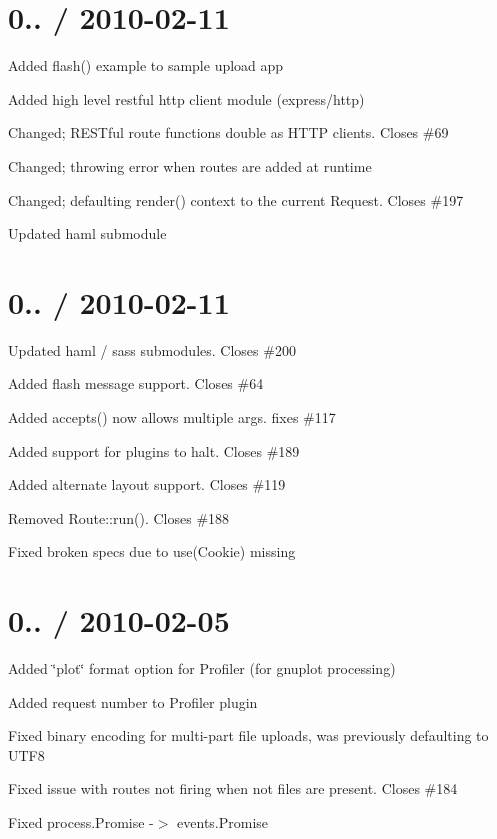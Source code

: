 \section*{0.. / 2010-\/02-\/11 }


\begin{DoxyItemize}
\item Added flash() example to sample upload app
\item Added high level restful http client module (express/http)
\item Changed; R\+E\+S\+Tful route functions double as H\+T\+T\+P clients. Closes \#69
\item Changed; throwing error when routes are added at runtime
\item Changed; defaulting render() context to the current Request. Closes \#197
\item Updated haml submodule
\end{DoxyItemize}

\section*{0.. / 2010-\/02-\/11 }


\begin{DoxyItemize}
\item Updated haml / sass submodules. Closes \#200
\item Added flash message support. Closes \#64
\item Added accepts() now allows multiple args. fixes \#117
\item Added support for plugins to halt. Closes \#189
\item Added alternate layout support. Closes \#119
\item Removed Route\+::run(). Closes \#188
\item Fixed broken specs due to use(\+Cookie) missing
\end{DoxyItemize}

\section*{0.. / 2010-\/02-\/05 }


\begin{DoxyItemize}
\item Added \char`\"{}plot\char`\"{} format option for Profiler (for gnuplot processing)
\item Added request number to Profiler plugin
\item Fixed binary encoding for multi-\/part file uploads, was previously defaulting to U\+T\+F8
\item Fixed issue with routes not firing when not files are present. Closes \#184
\item Fixed process.\+Promise -\/$>$ events.\+Promise
\end{DoxyItemize}

